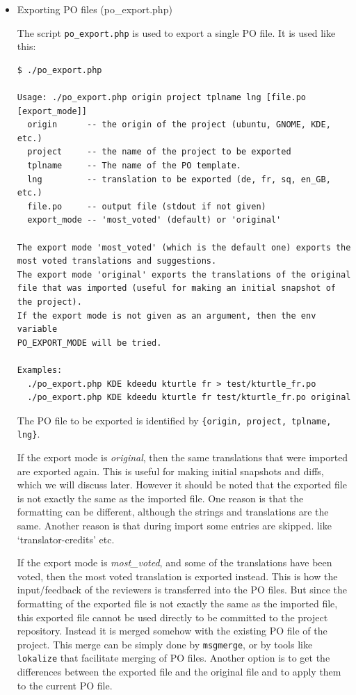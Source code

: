 \documentclass[11pt]{article}
\begin{document}
\begin{itemize}

\item Exporting PO files (po\_{}export.php)\\
\label{sec-8.4.3.1}


     The script \texttt{po\_export.php} is used to export a single PO file. It
     is used like this:

\begin{verbatim}
$ ./po_export.php

Usage: ./po_export.php origin project tplname lng [file.po [export_mode]]
  origin      -- the origin of the project (ubuntu, GNOME, KDE, etc.)
  project     -- the name of the project to be exported
  tplname     -- The name of the PO template.
  lng         -- translation to be exported (de, fr, sq, en_GB, etc.)
  file.po     -- output file (stdout if not given)
  export_mode -- 'most_voted' (default) or 'original'

The export mode 'most_voted' (which is the default one) exports the
most voted translations and suggestions.
The export mode 'original' exports the translations of the original
file that was imported (useful for making an initial snapshot of
the project).
If the export mode is not given as an argument, then the env variable
PO_EXPORT_MODE will be tried.

Examples:
  ./po_export.php KDE kdeedu kturtle fr > test/kturtle_fr.po
  ./po_export.php KDE kdeedu kturtle fr test/kturtle_fr.po original
\end{verbatim}



     The PO file to be exported is identified by \texttt{\{origin, project,      tplname, lng\}}.

     If the export mode is \emph{original}, then the same translations that
     were imported are exported again. This is useful for making initial
     snapshots and diffs, which we will discuss later. However it should
     be noted that the exported file is not exactly the same as the
     imported file.  One reason is that the formatting can be different,
     although the strings and translations are the same. Another reason
     is that during import some entries are skipped. like
     `translator-credits' etc.

     If the export mode is \emph{most\_{}voted}, and some of the translations
     have been voted, then the most voted translation is exported
     instead. This is how the input/feedback of the reviewers is
     transferred into the PO files. But since the formatting of the
     exported file is not exactly the same as the imported file, this
     exported file cannot be used directly to be committed to the project
     repository. Instead it is merged somehow with the existing PO file
     of the project. This merge can be simply done by \texttt{msgmerge}, or by
     tools like \texttt{lokalize} that facilitate merging of PO files. Another
     option is to get the differences between the exported file and the
     original file and to apply them to the current PO file.



\end{itemize}
\end{document}
